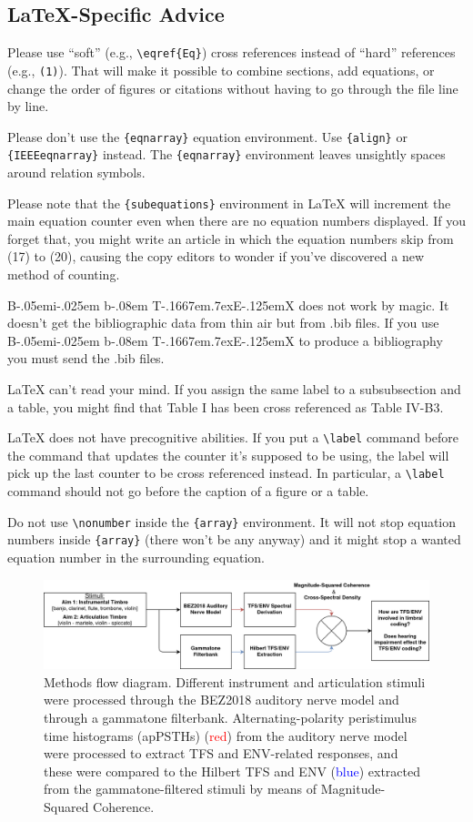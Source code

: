 \documentclass[conference]{IEEEtran}
\def\BibTeX{{\rm B\kern-.05em{\sc i\kern-.025em b}\kern-.08em
    T\kern-.1667em\lower.7ex\hbox{E}\kern-.125emX}}
\begin{document}
\subsection{\LaTeX-Specific Advice}

Please use ``soft'' (e.g., \verb|\eqref{Eq}|) cross references instead
of ``hard'' references (e.g., \verb|(1)|). That will make it possible
to combine sections, add equations, or change the order of figures or
citations without having to go through the file line by line.

Please don't use the \verb|{eqnarray}| equation environment. Use
\verb|{align}| or \verb|{IEEEeqnarray}| instead. The \verb|{eqnarray}|
environment leaves unsightly spaces around relation symbols.

Please note that the \verb|{subequations}| environment in {\LaTeX}
will increment the main equation counter even when there are no
equation numbers displayed. If you forget that, you might write an
article in which the equation numbers skip from (17) to (20), causing
the copy editors to wonder if you've discovered a new method of
counting.

{\BibTeX} does not work by magic. It doesn't get the bibliographic
data from thin air but from .bib files. If you use {\BibTeX} to produce a
bibliography you must send the .bib files. 

{\LaTeX} can't read your mind. If you assign the same label to a
subsubsection and a table, you might find that Table I has been cross
referenced as Table IV-B3. 

{\LaTeX} does not have precognitive abilities. If you put a
\verb|\label| command before the command that updates the counter it's
supposed to be using, the label will pick up the last counter to be
cross referenced instead. In particular, a \verb|\label| command
should not go before the caption of a figure or a table.

Do not use \verb|\nonumber| inside the \verb|{array}| environment. It
will not stop equation numbers inside \verb|{array}| (there won't be
any anyway) and it might stop a wanted equation number in the
surrounding equation.
\begin{figure}
\includegraphics[width = \textwidth]{methods_flow_sanspic}
\caption{Methods flow diagram. Different instrument and articulation stimuli were processed through the BEZ2018 auditory nerve model  and through a gammatone filterbank. Alternating-polarity peristimulus time histograms (apPSTHs) (\textcolor{red}{red}) from the auditory nerve model were processed to extract TFS and ENV-related responses, and these were compared to the Hilbert TFS and ENV (\textcolor{blue}{blue}) extracted from the gammatone-filtered stimuli by means of Magnitude-Squared Coherence.}
\label{fig:flow}
\end{figure}
\end{document}
